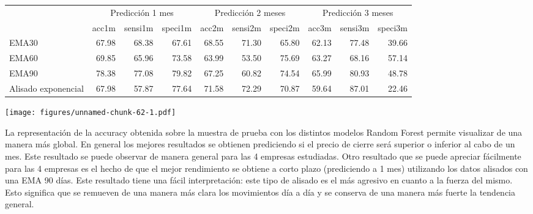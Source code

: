 \documentclass[]{DissertateUSU}
\begin{document}
\setlength\parskip{5ex}

\begin{table}[H]
\centering\begingroup\fontsize{10}{12}\selectfont

\begin{tabular}{l|r|r|r|r|r|r|r|r|r}
\hline
\multicolumn{1}{c|}{ } & \multicolumn{3}{c|}{Predicción 1 mes} & \multicolumn{3}{c|}{Predicción 2 meses} & \multicolumn{3}{c}{Predicción 3 meses} \\
\cline{2-4} \cline{5-7} \cline{8-10}
  & acc1m & sensi1m & speci1m & acc2m & sensi2m & speci2m & acc3m & sensi3m & speci3m\\
\hline
EMA30 & 67.98 & 68.38 & 67.61 & 68.55 & 71.30 & 65.80 & 62.13 & 77.48 & 39.66\\
\hline
EMA60 & 69.85 & 65.96 & 73.58 & 63.99 & 53.50 & 75.69 & 63.27 & 68.16 & 57.14\\
\hline
EMA90 & 78.38 & 77.08 & 79.82 & 67.25 & 60.82 & 74.54 & 65.99 & 80.93 & 48.78\\
\hline
Alisado exponencial & 67.98 & 57.87 & 77.64 & 71.58 & 72.29 & 70.87 & 59.64 & 87.01 & 22.46\\
\hline
\end{tabular}
\endgroup{}
\end{table}

\setlength\parskip{5ex}
\justifying

\texttt{[image: figures/unnamed-chunk-62-1.pdf]}

\setlength\parskip{5ex}
\justifying

\noindent La representación de la accuracy obtenida sobre la muestra de
prueba con los distintos modelos Random Forest permite visualizar de una
manera más global. En general los mejores resultados se obtienen
prediciendo si el precio de cierre será superior o inferior al cabo de
un mes. Este resultado se puede observar de manera general para las 4
empresas estudiadas. Otro resultado que se puede apreciar fácilmente
para las 4 empresas es el hecho de que el mejor rendimiento se obtiene a
corto plazo (prediciendo a 1 mes) utilizando los datos alisados con una
EMA 90 días. Este resultado tiene una fácil interpretación: este tipo de
alisado es el más agresivo en cuanto a la fuerza del mismo. Esto
significa que se remueven de una manera más clara los movimientos día a
día y se conserva de una manera más fuerte la tendencia general.
\end{document}
